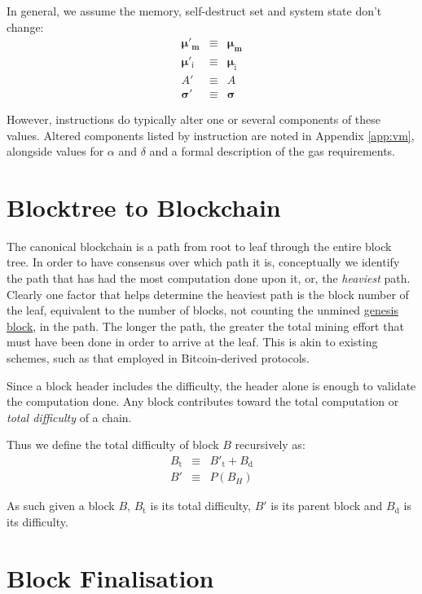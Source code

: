 \documentclass[9pt,oneside]{amsart}
\begin{document}
\begin{multicols}{2}
In general, we assume the memory, self-destruct set and system state don't change:
\begin{eqnarray}
\boldsymbol{\mu}'_{\mathbf{m}} & \equiv & \boldsymbol{\mu}_{\mathbf{m}} \\
\boldsymbol{\mu}'_{\mathrm{i}} & \equiv & \boldsymbol{\mu}_{\mathrm{i}} \\
A' & \equiv & A \\
\boldsymbol{\sigma}' & \equiv & \boldsymbol{\sigma}
\end{eqnarray}

However, instructions do typically alter one or several components of these values. Altered components listed by instruction are noted in Appendix \ref{app:vm}, alongside values for $\alpha$ and $\delta$ and a formal description of the gas requirements.

\section{Blocktree to Blockchain} \label{ch:ghost}

The canonical blockchain is a path from root to leaf through the entire block tree. In order to have consensus over which path it is, conceptually we identify the path that has had the most computation done upon it, or, the \textit{heaviest} path. Clearly one factor that helps determine the heaviest path is the block number of the leaf, equivalent to the number of blocks, not counting the unmined \hyperlink{Genesis_Block}{genesis block}, in the path. The longer the path, the greater the total mining effort that must have been done in order to arrive at the leaf. This is akin to existing schemes, such as that employed in Bitcoin-derived protocols.

Since a block header includes the difficulty, the header alone is enough to validate the computation done. Any block contributes toward the total computation or \textit{total difficulty} of a chain.

Thus we define the total difficulty of block $B$ recursively as:
\begin{eqnarray}
B_{\mathrm{t}} & \equiv & B'_{\mathrm{t}} + B_{\mathrm{d}} \\
B' & \equiv & P(B_{H})
\end{eqnarray}

As such given a block $B$, $B_{\mathrm{t}}$ is its total difficulty, $B'$ is its parent block and $B_{\mathrm{d}}$ is its difficulty.

\section{Block Finalisation} \label{ch:finalisation}


\end{multicols}
\end{document}
